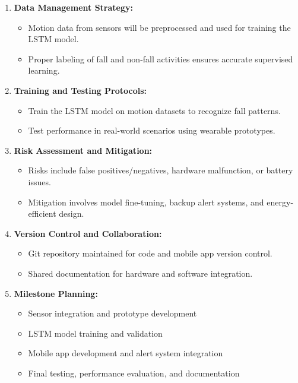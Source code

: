 \documentclass[a4paper, 12pt]{report}
\begin{document}
\begin{enumerate}[itemsep=-4pt, label=\textbf{\roman*.}]
    \item \textbf{Data Management Strategy: }
    \vspace{-4pt}
    \begin{itemize}[itemsep=-4pt]
        \item Motion data from sensors will be preprocessed and used for training the LSTM model.
        \item Proper labeling of fall and non-fall activities ensures accurate supervised learning.
    \end{itemize}

    \item \textbf{Training and Testing Protocols: }
    \vspace{-4pt}
    \begin{itemize}[itemsep=-4pt]
        \item Train the LSTM model on motion datasets to recognize fall patterns.
        \item Test performance in real-world scenarios using wearable prototypes.
    \end{itemize}

    \item \textbf{Risk Assessment and Mitigation: }
    \vspace{-4pt}
    \begin{itemize}[itemsep=-4pt]
        \item Risks include false positives/negatives, hardware malfunction, or battery issues.
        \item Mitigation involves model fine-tuning, backup alert systems, and energy-efficient design.
    \end{itemize}

    \item \textbf{Version Control and Collaboration: }
    \vspace{-4pt}
    \begin{itemize}[itemsep=-4pt]
        \item Git repository maintained for code and mobile app version control.
        \item Shared documentation for hardware and software integration.
    \end{itemize}

    \item \textbf{Milestone Planning: }
    \vspace{-4pt}
    \begin{itemize}[itemsep=-4pt]
        \item Sensor integration and prototype development
        \item LSTM model training and validation
        \item Mobile app development and alert system integration
        \item Final testing, performance evaluation, and documentation
    \end{itemize}
\end{enumerate}
\end{document}
